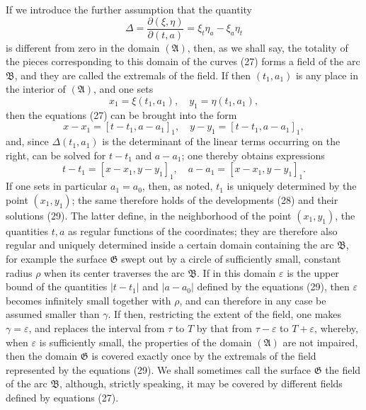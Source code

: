 \documentclass[11pt,a4paper,leqno]{article}
\begin{document}
If we introduce the further assumption that the quantity
\[
\Delta=\frac{\partial(\xi,\eta)}{\partial(t,a)}=\xi_t\eta_a-\xi_a\eta_t
\]
is different from zero in the domain $(\mathfrak{A})$, then, as we shall say, the totality of the pieces corresponding to this domain
of the curves (27) forms a field of the arc $\mathfrak{B}$, and they are called the extremals of the field. If then $(t_1,a_1)$ is any place in the interior of $(\mathfrak{A})$, and one sets
\[
x_1=\xi(t_1,a_1),\quad y_1=\eta(t_1,a_1),
\]
then the equations (27) can be brought into the form
\begin{equation}\tag{28}
x-x_1=[t-t_1,a-a_1]_1,
\quad y-y_1=[t-t_1,a-a_1]_1,
\end{equation}
and, since $\Delta(t_1,a_1)$ is the determinant of the linear terms occurring on the right, can be solved for $t-t_1$ and $a-a_1$; one thereby obtains expressions
\begin{equation}\tag{29}
t-t_1=[x-x_1,y-y_1]_1,
\quad a-a_1=[x-x_1,y-y_1]_1.
\end{equation}
If one sets in particular $a_1=a_0$, then, as noted, $t_1$ is uniquely determined by the point $(x_1,y_1)$; the same therefore holds of the developments (28) and their solutions (29). The latter define, in the neighborhood of the point $(x_1,y_1)$, the quantities $t,a$ as regular functions of the coordinates; they are therefore also regular and uniquely determined inside a certain domain containing the arc $\mathfrak{B}$, for example the surface $\mathfrak{G}$ swept out by a circle of sufficiently small, constant radius $\rho$ when its center traverses the arc $\mathfrak{B}$. If in this domain $\varepsilon$ is the upper bound of the quantities $|t-t_1|$ and $|a-a_0|$ defined by the equations (29), then $\varepsilon$ becomes infinitely small together with $\rho$, and can therefore in any case be assumed smaller than $\gamma$. If then, restricting the extent of the field, one makes $\gamma=\varepsilon$, and replaces the interval from $\tau$ to $T$ by that from $\tau-\varepsilon$ to $T+\varepsilon$, whereby, when $\varepsilon$ is sufficiently small, the properties of the domain $(\mathfrak{A})$ are not impaired, then the domain $\mathfrak{G}$ is covered exactly once by the extremals of the field represented by the equations (29). We shall sometimes call the surface $\mathfrak{G}$ the field of the arc $\mathfrak{B}$, although, strictly speaking, it may be covered by different fields defined by equations (27).
\end{document}
